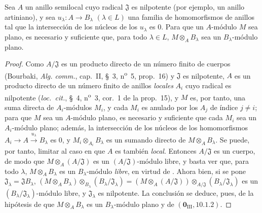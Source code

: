\begin{corollary}[11.4.3]
\label{IV.11.4.3}
Sea $A$ un anillo semilocal cuyo radical $\mathfrak J$ es nilpotente (por
ejemplo, un anillo artiniano), y sea $u_\lambda:A\to B_\lambda$ $(\lambda\in L)$ una familia de homomorfismos de anillos tal
que la intersección de los núcleos de los $u_\lambda$ es $0$. Para que un $A$-módulo $M$ sea plano, es necesario y
suficiente que, para todo $\lambda\in L$, $M\otimes_A B_\lambda$ sea un $B_\lambda$-módulo plano.
\end{corollary}

\begin{proof}
Como $A/\mathfrak J$ es un producto directo de un número finito de cuerpos (Bourbaki, \emph{Alg. comm.},
cap.~II, \S~3, n\textsuperscript{o}~5, prop.~16) y $\mathfrak J$ es nilpotente, $A$ es un producto directo de un
número finito de anillos \emph{locales} $A_i$ cuyo radical es nilpotente (\emph{loc.\ cit.}, \S~4, n\textsuperscript{o}~3, cor.~1
de la prop.~15), y $M$ es, por tanto, una suma directa de $A_i$-módulos $M_i$, y cada $M_i$ es
anulado por los $A_j$ de índice $j\neq i$; para que $M$ sea un $A$-módulo plano, es necesario y
suficiente que cada $M_i$ sea un $A_i$-módulo plano; además, la intersección de los núcleos
de los homomorfismos $A_i\longrightarrow A\xrightarrow{u_\lambda}B_\lambda$ es $0$, y $M_i\otimes_{A_i}B_\lambda$ es un sumando directo
de $M\otimes_A B_\lambda$. Se puede, por tanto, limitar al caso en que $A$ es también \emph{local}. Entonces $A/\mathfrak J$ es un
cuerpo, de modo que $M\otimes_A(A/\mathfrak J)$ es un $(A/\mathfrak J)$-módulo libre, y basta ver que, para
todo $\lambda$, $M\otimes_A B_\lambda$ es un $B_\lambda$-módulo \emph{libre}, en virtud de . Ahora bien, si se pone $\mathfrak J_\lambda=\mathfrak JB_\lambda$,
$(M\otimes_A B_\lambda)\otimes_{B_\lambda}(B_\lambda/\mathfrak J_\lambda)
=(M\otimes_A(A/\mathfrak J))\otimes_{A/\mathfrak J}
 (B_\lambda/\mathfrak J_\lambda)$ es un $(B_\lambda/\mathfrak J_\lambda)$-módulo libre, y $\mathfrak J_\lambda$ es
nilpotente. La conclusión se deduce, pues, de la hipótesis de que $M\otimes_A B_\lambda$ es un $B_\lambda$-módulo
plano y de $(\mathbf 0_{\mathrm{III}},10.1.2)$.
\end{proof}

